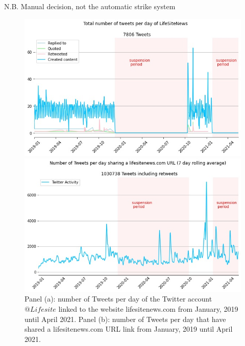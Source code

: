 \documentclass[11pt,a4paper]{article}
\begin{document}
{\color{red} N.B. Manual decision, not the automatic strike system}
\begin{figure}
\centering
	\begin{multicols}{1}
		\includegraphics[scale=0.25]{./img/lifesite.jpg} 
	\end{multicols}
	\begin{multicols}{1}
		\includegraphics[scale=0.25]{./img/lifesite_rolling_7_lifesite.jpg}
	\end{multicols}
\caption{Panel (a): number of Tweets per day of the Twitter account $@Lifesite$ linked to the website lifesitenews.com from January, 2019 until April 2021. Panel (b): number of Tweets per day that have shared a lifesitenews.com URL link from January, 2019 until April 2021. }
\label{fig2}
\end{figure}
\end{document}
